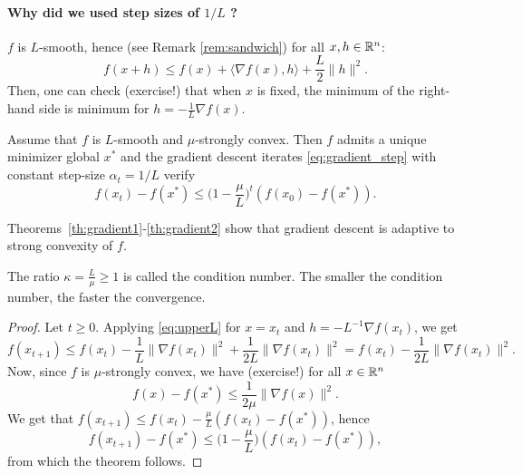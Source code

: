 \documentclass[11pt,nocut]{article}
\begin{document}
\paragraph{Why did we used step sizes of $1/L$ ?} $f$ is $L$-smooth, hence (see Remark \ref{rem:sandwich}) for all $x,h \in \mathbb{R}^n$:
\begin{equation}\label{eq:upperL}
f(x+h) \leq f(x) + \langle \nabla f(x) , h \rangle + \frac{L}{2} \|h\|^2.
\end{equation}
Then, one can check (exercise!) that when $x$ is fixed, the minimum of the right-hand side is minimum for $h = - \frac{1}{L} \nabla f(x)$.

\begin{theorem}\label{th:gradient2}
	Assume that $f$ is $L$-smooth and $\mu$-strongly convex. 
	Then $f$ admits a unique minimizer global $x^*$ and
	the gradient descent iterates \eqref{eq:gradient_step} with constant step-size $\alpha_t = 1/L$ verify
	$$
	f(x_t) - f(x^*) \leq \Big(1-\frac{\mu}{L}\Big)^t (f(x_0) - f(x^*)).
	$$
\end{theorem}
\begin{remark}
	Theorems~\ref{th:gradient1}-\ref{th:gradient2} show that gradient descent is adaptive to strong convexity of $f$.
\end{remark}
\begin{remark}
	The ratio $\kappa = \frac{L}{\mu} \geq 1$ is called the condition number. The smaller the condition number, the faster the convergence.
\end{remark}
\begin{proof}
	Let $t \geq 0$. Applying \eqref{eq:upperL} for $x=x_t$ and $h=- L^{-1} \nabla f(x_t)$, we get
	$$
	f(x_{t+1}) 
	\leq f(x_t) - \frac{1}{L} \|\nabla f(x_t) \|^2 + \frac{1}{2L}\|\nabla f(x_t) \|^2
	= f(x_t) - \frac{1}{2L} \|\nabla f(x_t) \|^2.
	$$
	Now, since $f$ is $\mu$-strongly convex, we have (exercise!) for all $x \in \mathbb{R}^n$
	\begin{equation}\label{eq:boundG}
		f(x) - f(x^*) \leq \frac{1}{2 \mu} \|\nabla f(x)\|^2.
	\end{equation}
We get that $f(x_{t+1}) \leq f(x_t) - \frac{\mu}{L}(f(x_t) - f(x^*))$, hence
$$
f(x_{t+1}) - f(x^*) \leq \Big(1 - \frac{\mu}{L}\Big)(f(x_t) - f(x^*)),
$$
from which the theorem follows.
\end{proof}
\end{document}
